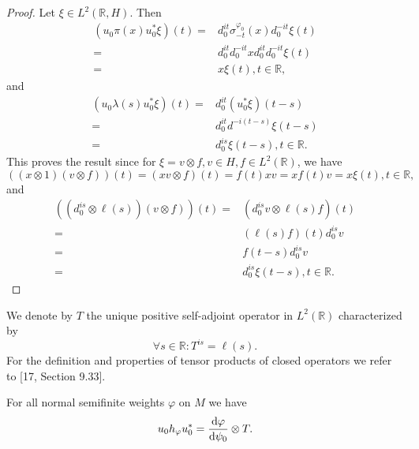 \begin{proof}
    Let $\xi\in L^2(\mathbb{R},H)$. Then
    \[
        \begin{split}
            (u_0\pi(x)u_0^*\xi)(t)=&d_0^{it}\sigma_{-t}^{\varphi_0}(x)d_0^{-it}\xi(t)\\
            =&d_0^{it}d_0^{-it}xd_0^{it}d_0^{-it}\xi(t)\\
            =&x\xi(t),t\in \mathbb{R},
        \end{split}
    \]
    and
    \[
        \begin{split}
            (u_0\lambda(s)u_0^*\xi)(t)=&d_0^{it}(u_0^*\xi)(t-s)\\
            =&d_0^{it}d^{-i(t-s)}\xi(t-s)\\
            =&d_0^{is}\xi(t-s),t\in \mathbb{R}.
        \end{split}
    \]
    This proves the result since for $\xi=v\otimes f,v\in H,f\in L^2(\mathbb{R})$, we have
    \[
        ((x\otimes 1)(v\otimes f))(t)=(xv\otimes f)(t)=f(t)xv=xf(t)v=x\xi(t),t\in \mathbb{R},
    \]
    and
    \[
        \begin{split}
            ((d_0^{is}\otimes\ell(s))(v\otimes f))(t)=&(d_0^{is}v\otimes \ell(s)f)(t)\\
            =&(\ell(s)f)(t)d_0^{is}v\\
            =&f(t-s)d_0^{is}v\\
            =&d_0^{is}\xi(t-s),t\in \mathbb{R}.
        \end{split}
    \]
\end{proof}
We denote by $T$ the unique positive self-adjoint operator in $L^2(\mathbb{R})$ characterized by
\begin{equation}
    \forall s\in \mathbb{R}: T^{is}=\ell(s).
\end{equation}
For the definition and properties of tensor products of closed operators we refer to [17, Section 9.33].
\begin{proposition}
    For all normal semifinite weights $\varphi$ on $M$ we have
    \begin{equation}\label{Chap4: Eqn: 9}
        u_0h_\varphi u_0^*=\dv{\varphi}{\psi_0}\otimes T.
    \end{equation}
\end{proposition}
